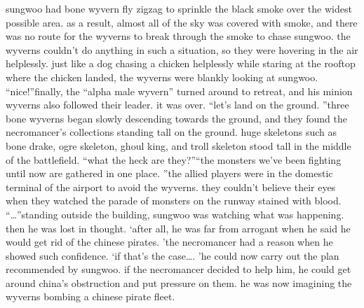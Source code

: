 sungwoo had bone wyvern fly zigzag to sprinkle the black smoke over the widest possible area.
 as a result, almost all of the sky was covered with smoke, and there was no route for the wyverns to break through the smoke to chase sungwoo.
the wyverns couldn’t do anything in such a situation, so they were hovering in the air helplessly.
 just like a dog chasing a chicken helplessly while staring at the rooftop where the chicken landed, the wyverns were blankly looking at sungwoo.
“nice!”finally, the “alpha male wyvern” turned around to retreat, and his minion wyverns also followed their leader.
it was over.
“let’s land on the ground.
”three bone wyverns began slowly descending towards the ground, and they found the necromancer’s collections standing tall on the ground.
huge skeletons such as bone drake, ogre skeleton, ghoul king, and troll skeleton stood tall in the middle of the battlefield.
 “what the heck are they?”“the monsters we’ve been fighting until now are gathered in one place.
”the allied players were in the domestic terminal of the airport to avoid the wyverns.
they couldn’t believe their eyes when they watched the parade of monsters on the runway stained with blood.
“…”standing outside the building, sungwoo was watching what was happening.
then he was lost in thought.
‘after all, he was far from arrogant when he said he would get rid of the chinese pirates.
’the necromancer had a reason when he showed such confidence.
‘if that’s the case….
’he could now carry out the plan recommended by sungwoo.
if the necromancer decided to help him, he could get around china’s obstruction and put pressure on them.
he was now imagining the wyverns bombing a chinese pirate fleet.


 